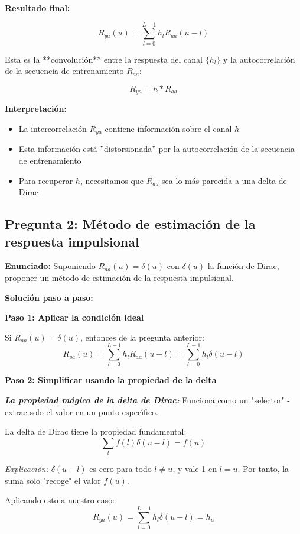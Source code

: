 \documentclass[11pt,a4paper]{article}
\begin{document}
\textbf{Resultado final:}

\[
\boxed{R_{ya}(u) = \sum_{l=0}^{L-1} h_l R_{aa}(u-l)}
\]

Esta es la **convoluci\'on** entre la respuesta del canal $\{h_l\}$ y la autocorrelaci\'on de la secuencia de entrenamiento $R_{aa}$:

\[
\boxed{R_{ya} = h * R_{aa}}
\]

\textbf{Interpretaci\'on:}

\begin{itemize}
    \item La intercorrelaci\'on $R_{ya}$ contiene informaci\'on sobre el canal $h$
    \item Esta informaci\'on est\'a ''distorsionada'' por la autocorrelaci\'on de la secuencia de entrenamiento
    \item Para recuperar $h$, necesitamos que $R_{aa}$ sea lo m\'as parecida a una delta de Dirac
\end{itemize}



\subsection*{Pregunta 2: M\'etodo de estimaci\'on de la respuesta impulsional}

\textbf{Enunciado:} Suponiendo $R_{aa}(u) = \delta(u)$ con $\delta(u)$ la funci\'on de Dirac, proponer un m\'etodo de estimaci\'on de la respuesta impulsional.

\vspace{0.3cm}
\textbf{Soluci\'on paso a paso:}

\textbf{Paso 1: Aplicar la condici\'on ideal}

Si $R_{aa}(u) = \delta(u)$, entonces de la pregunta anterior:
\[
R_{ya}(u) = \sum_{l=0}^{L-1} h_l R_{aa}(u-l) = \sum_{l=0}^{L-1} h_l \delta(u-l)
\]

\textbf{Paso 2: Simplificar usando la propiedad de la delta}

\textit{\textbf{La propiedad m\'agica de la delta de Dirac:}} Funciona como un "selector" - extrae solo el valor en un punto espec\'{\i}fico.

La delta de Dirac tiene la propiedad fundamental:
\[
\sum_l f(l) \delta(u-l) = f(u)
\]

\textit{Explicaci\'on:} $\delta(u-l)$ es cero para todo $l \neq u$, y vale 1 en $l = u$. Por tanto, la suma solo "recoge" el valor $f(u)$.

Aplicando esto a nuestro caso:
\[
R_{ya}(u) = \sum_{l=0}^{L-1} h_l \delta(u-l) = h_u
\]
\end{document}
